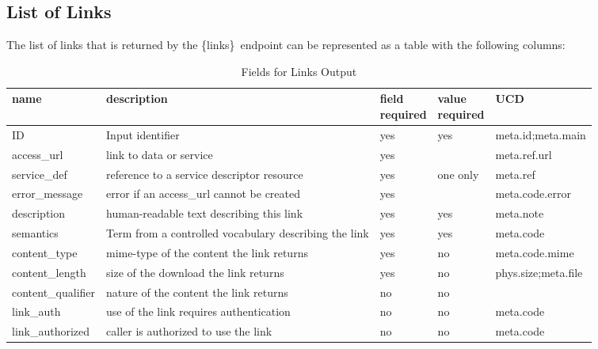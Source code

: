 \documentclass[11pt,a4paper]{ivoa}
\newcommand{\blinks}{\{links\}}
\begin{document}
\subsection{List of Links}
\label{sec:listOfLinks}

The list of links that is returned by the \blinks\ endpoint can be
represented as a table with the following columns:
\begin{table}[h]
\begin{center}
\begin{tabular}{|l|p{}|p{}|p{}|l|}
\hline
{\bf name}      & {\bf description} & {\bf field \newline required} & {\bf value \newline required} & {\bf UCD} \\
\hline
ID              & Input identifier & yes & yes & meta.id;meta.main \\
\hline
access\_url     & link to data or service 
                & yes &          & meta.ref.url \\
\cline{1-3} \cline{5-5}
service\_def    & reference to a service descriptor resource
                & yes & one only & meta.ref \\
\cline{1-3} \cline{5-5}
error\_message  & error if an access\_url cannot be created
                & yes &          & meta.code.error \\
\hline
description     & human-readable text describing this link
                & yes & yes & meta.note \\
\hline
semantics       & Term from a controlled vocabulary describing the link
                & yes & yes & meta.code \\
\hline
content\_type   & mime-type of the content the link returns
                & yes & no & meta.code.mime \\
\hline
content\_length & size of the download the link returns
                & yes & no & phys.size;meta.file \\
\hline
content\_qualifier & nature of the content the link returns
                & no & no & \\
\hline
link\_auth       & use of the link requires authentication
                 & no & no & meta.code \\
\hline
link\_authorized & caller is authorized to use the link
                 & no & no & meta.code \\
\hline
\end{tabular}
\end{center}
\caption{Fields for Links Output}
\label{fig:linkFields}
\end{table}
\end{document}
